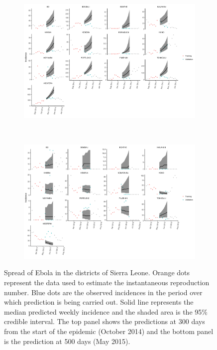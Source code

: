 \documentclass[11pt,]{article}
\begin{document}
\begin{figure}
  \centering
  \begin{subfigure}{0.8\textwidth}
    \includegraphics{ms6-figures/sl_summary_projections_0.9_1_300}
  \end{subfigure}
  ~
  \begin{subfigure}{0.8\textwidth}
    \includegraphics{ms6-figures/sl_summary_projections_0.9_1_500}
  \end{subfigure}  
  
  \caption[Sierra Leone Projections]{Spread of Ebola in the districts
    of Sierra Leone. Orange dots represent the data used to estimate
    the instantaneous reproduction number. Blue dots are the observed incidences in
    the period over which prediction is being carried out. Solid line
    represents the median predicted weekly incidence and the shaded
    area is the 95\% credible interval. The top panel shows the
    predictions at 300 days from the start of the epidemic (October
    2014) and the
    bottom panel is the prediction at 500 days (May 2015).}
  \label{fig:sl-predictions}
\end{figure}
\end{document}
